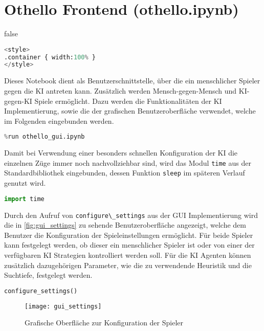 \hypertarget{othello-frontend-othello.ipynb}{%
\section{Othello Frontend
(othello.ipynb)}\label{othello-frontend-othello.ipynb}}

\label{sec:frontend} \ifx false

\begin{lstlisting}[language=Python]
%%HTML
<style>
.container { width:100% }
</style>
\end{lstlisting}

\fi Dieses Notebook dient als Benutzerschnittstelle, über die ein
menschlicher Spieler gegen die \ac{KI} antreten kann. Zusätzlich werden
Mensch-gegen-Mensch und \ac{KI}-gegen-\ac{KI} Spiele ermöglicht. Dazu
werden die Funktionalitäten der \ac{KI} Implementierung, sowie die der
grafischen Benutzeroberfläche verwendet, welche im Folgenden eingebunden
werden.

\begin{lstlisting}[language=Python]
%run othello_ai.ipynb
%run othello_gui.ipynb
\end{lstlisting}

Damit bei Verwendung einer besonders schnellen Konfiguration der \ac{KI}
die einzelnen Züge immer noch nachvollziehbar sind, wird das Modul
\passthrough{\lstinline!time!} aus der Standardbibliothek eingebunden,
dessen Funktion \passthrough{\lstinline!sleep!} im späteren Verlauf
genutzt wird.

\begin{lstlisting}[language=Python]
import time
\end{lstlisting}

Durch den Aufruf von \passthrough{\lstinline!configure\_settings!} aus
der \ac{GUI} Implementierung wird die in \autoref{fig:gui_settings} zu
sehende Benutzeroberfläche angezeigt, welche dem Benutzer die
Konfiguration der Spieleinstellungen ermöglicht. Für beide Spieler kann
festgelegt werden, ob dieser ein menschlicher Spieler ist oder von einer
der verfügbaren \ac{KI} Strategien kontrolliert werden soll. Für die
\ac{KI} Agenten können zusätzlich dazugehörigen Parameter, wie die zu
verwendende Heuristik und die Suchtiefe, festgelegt werden.

\begin{lstlisting}[language=Python]
configure_settings()
\end{lstlisting}

\begin{figure}[H]
    \centering
    \texttt{[image: gui\_settings]}
    \caption{Grafische Oberfläche zur Konfiguration der Spieler}
    \label{fig:gui_settings}
\end{figure}

